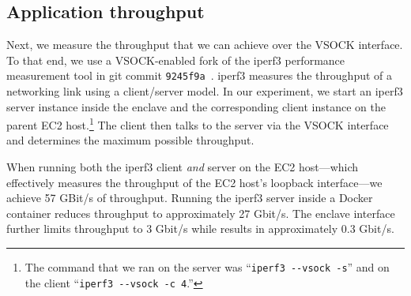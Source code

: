 \subsection{Application throughput}%
\label{sec:throughput}

Next, we measure the throughput that we can achieve over the VSOCK interface.
To that end, we use a VSOCK-enabled fork of the iperf3 performance measurement
tool in git commit \texttt{9245f9a}~\cite{iperf-vsock}.  iperf3 measures the
throughput of a networking link using a client/server model.  In our
experiment, we start an iperf3 server instance inside the enclave and the
corresponding client instance on the parent EC2 host.\footnote{The command that
we ran on the server was ``\texttt{iperf3 -{}-vsock -s}'' and on the client
``\texttt{iperf3 -{}-vsock -c 4}.''} The client then talks to the server via
the VSOCK interface and determines the maximum possible throughput.

When running both the iperf3 client \emph{and} server on the EC2 host---which
effectively measures the throughput of the EC2 host's loopback interface---we
achieve 57 GBit/s of throughput.  Running the iperf3 server inside a Docker
container reduces throughput to approximately 27 Gbit/s.  The enclave interface
further limits throughput to 3 Gbit/s while \tool{} results in approximately
0.3 Gbit/s.
